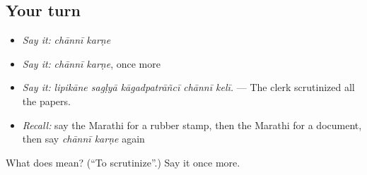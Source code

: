 \subsection*{Your turn}
\begin{itemize}
\raggedright
  \item \emph{Say it:} \emph{chānnī karṇe}
  \item \emph{Say it:} \emph{chānnī karṇe}, once more
  \item \emph{Say it:} \emph{lipikāne sagḷyā kāgadpatrāñcī chānnī kelī.} — The clerk scrutinized all the papers.
  \item \emph{Recall:} say the Marathi for a rubber stamp, then the Marathi for a document, then say \emph{chānnī karṇe} again
\end{itemize}

\begin{tcolorbox}[breakable,colback=teal!4,colframe=teal!35!black,title={Before you move on}]
What does   mean? (\textquotedblleft{}To scrutinize\textquotedblright{}.) Say it once more.
\end{tcolorbox}
